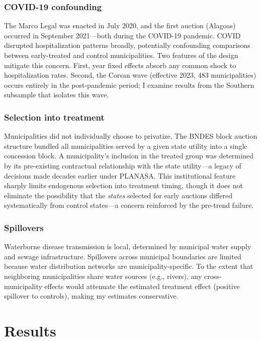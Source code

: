 \documentclass[12pt]{article}
\begin{document}
\subsubsection*{COVID-19 confounding} The Marco Legal was enacted in July 2020, and the first auction (Alagoas) occurred in September 2021---both during the COVID-19 pandemic. COVID disrupted hospitalization patterns broadly, potentially confounding comparisons between early-treated and control municipalities. Two features of the design mitigate this concern. First, year fixed effects absorb any common shock to hospitalization rates. Second, the Corsan wave (effective 2023, 483 municipalities) occurs entirely in the post-pandemic period; I examine results from the Southern subsample that isolates this wave.

\subsubsection*{Selection into treatment} Municipalities did not individually choose to privatize. The BNDES block auction structure bundled all municipalities served by a given state utility into a single concession block. A municipality's inclusion in the treated group was determined by its pre-existing contractual relationship with the state utility---a legacy of decisions made decades earlier under PLANASA. This institutional feature sharply limits endogenous selection into treatment timing, though it does not eliminate the possibility that the \textit{states} selected for early auctions differed systematically from control states---a concern reinforced by the pre-trend failure.

\subsubsection*{Spillovers} Waterborne disease transmission is local, determined by municipal water supply and sewage infrastructure. Spillovers across municipal boundaries are limited because water distribution networks are municipality-specific. To the extent that neighboring municipalities share water sources (e.g., rivers), any cross-municipality effects would attenuate the estimated treatment effect (positive spillover to controls), making my estimates conservative.


\section{Results}
\end{document}
